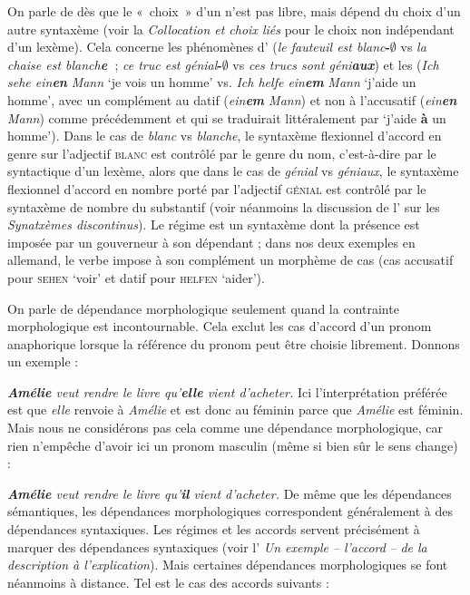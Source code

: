{    On parle de  dès que le «~choix~» d’un  n’est pas libre, mais dépend du choix d’un autre syntaxème (voir la  \textit{Collocation et choix liés} pour le choix non indépendant d’un lexème). Cela concerne les phénomènes d’ (\textit{le fauteuil est blanc}\textbf{{}-}\textrm{\textbf{${\emptyset}$}} vs \textit{la chaise est blanch}\textbf{\textit{e~}}; \textit{ce truc est génial}\textbf{{}-}\textrm{\textbf{${\emptyset}$}} vs \textit{ces trucs sont géni}\textbf{\textit{aux}}) et les  (\textit{Ich sehe ein}\textbf{\textit{en}} \textit{Mann} ‘je vois un homme’ vs. \textit{Ich helfe ein}\textbf{\textit{em}} \textit{Mann} ‘j’aide un homme’, avec un complément au datif (\textit{ein\textbf{em} Mann}) et non à l’accusatif (\textit{ein\textbf{en} Mann}) comme précédemment et qui se traduirait littéralement par ‘j’aide \textbf{à} un homme’). Dans le cas de \textit{blanc} vs \textit{blanche}, le syntaxème flexionnel d’accord en genre sur l’adjectif \textsc{blanc} est contrôlé par le genre du nom, c’est-à-dire par le syntactique d’un lexème, alors que dans le cas de \textit{génial} vs \textit{géniaux}, le syntaxème flexionnel d’accord en nombre porté par l’adjectif \textsc{génial} est contrôlé par le syntaxème de nombre du substantif (voir néanmoins la discussion de l' sur les \textit{Synatxèmes discontinus}). Le régime est un syntaxème dont la présence est imposée par un gouverneur à son dépendant ; dans nos deux exemples en allemand, le verbe impose à son complément un morphème de cas (cas accusatif pour \textsc{sehen} ‘voir’ et datif pour \textsc{helfen} ‘aider’).

    On parle de dépendance morphologique seulement quand la contrainte morphologique est incontournable. Cela exclut les cas d’accord d’un pronom anaphorique lorsque la référence du pronom peut être choisie librement. Donnons un exemple :
    
    \ea
        \textit{\textbf{{Amélie}}  {veut rendre le livre qu’}\textbf{{elle}}  {vient d’acheter.}}
    \z
    Ici l’interprétation préférée est que \textit{elle} renvoie à \textit{Amélie} et est donc au féminin parce que \textit{Amélie} est féminin. Mais nous ne considérons pas cela comme une dépendance morphologique, car rien n’empêche d’avoir ici un pronom masculin (même si bien sûr le sens change) :
    
    \ea
        \textit{\textbf{{Amélie}}  {veut rendre le livre qu’}\textbf{{il}}  {vient d’acheter.}}
    \z
    De même que les dépendances sémantiques, les dépendances morphologiques correspondent généralement à des dépendances syntaxiques. Les régimes et les accords servent précisément à marquer des dépendances syntaxiques (voir l' \textit{Un exemple –} \textit{l’accord} \textit{–} \textit{de la description à l’explication}). Mais certaines dépendances morphologiques se font néanmoins à distance. Tel est le cas des accords suivants :
    
}

